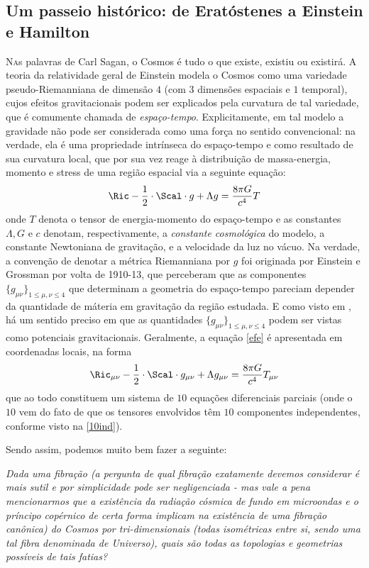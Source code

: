 \subsection*{Um passeio histórico: de Eratóstenes a Einstein e Hamilton}
\lettrine[nindent=2em,lines=1]{N} as palavras de Carl Sagan, o Cosmos é tudo o que existe, existiu ou existirá. A teoria da relatividade geral de Einstein modela o Cosmos como uma variedade pseudo-Riemanniana de dimensão $4$ (com $3$ dimensões espaciais e $1$ temporal), cujos efeitos gravitacionais podem ser explicados pela curvatura de tal variedade, que é comumente chamada de \textit{espaço-tempo}. Explicitamente, em tal modelo a gravidade não pode ser considerada como uma força no sentido convencional: na verdade, ela é uma propriedade intrínseca do espaço-tempo e  como resultado de sua curvatura local, que por sua vez reage à distribuição de massa-energia, momento e stress de uma região espacial via a seguinte equação:
\begin{equation}\label{efe}
\Ric - \frac{1}{2} \cdot \Scal \cdot g + \Lambda g = \frac{8 \pi G}{c^4} T
\end{equation}
onde $T$ denota o tensor de energia-momento do espaço-tempo e as constantes $\Lambda, G$ e $c$ denotam, respectivamente, a \emph{constante cosmológica} do modelo, a constante Newtoniana de gravitação, e a velocidade da luz no vácuo. Na verdade, a convenção de denotar a métrica Riemanniana por $g$ foi originada por Einstein e Grossman por volta de 1910-13, que perceberam que as componentes $\{g_{\mu \nu} \}_{1 \leq \mu, \nu \leq 4}$ que determinam a geometria do espaço-tempo pareciam depender da quantidade de máteria em gravitação da região estudada. E como visto em , há um sentido preciso em que as quantidades $\{g_{\mu \nu} \}_{1 \leq \mu, \nu \leq 4}$ podem ser vistas como potenciais gravitacionais. Geralmente, a equação \cref{efe} é apresentada em coordenadas locais, na forma
\[
\Ric_{\mu \nu} - \frac{1}{2} \cdot \Scal \cdot g_{\mu \nu} + \Lambda g_{\mu \nu} = \frac{8 \pi G}{c^4} T_{\mu \nu}
\]
que ao todo constituem um sistema de $10$ equações diferenciais parciais (onde o $10$ vem do fato de que os tensores envolvidos têm $10$ componentes independentes, conforme visto na \cref{10ind}). \par 
Sendo assim, podemos muito bem fazer a seguinte:
\begin{pergunta}\label{FibUniverso}
\textit{Dada uma fibração (a pergunta de qual fibração exatamente devemos considerar é mais sutil e por simplicidade pode ser negligenciada - mas vale a pena mencionarmos que a existência da radiação cósmica de fundo em microondas e o príncipo copérnico de certa forma implicam na existência de uma fibração canônica) do Cosmos por  tri-dimensionais (todas isométricas entre si, sendo uma tal fibra denominada de Universo), quais são todas as topologias e geometrias possíveis de tais fatias?}
\end{pergunta} 
